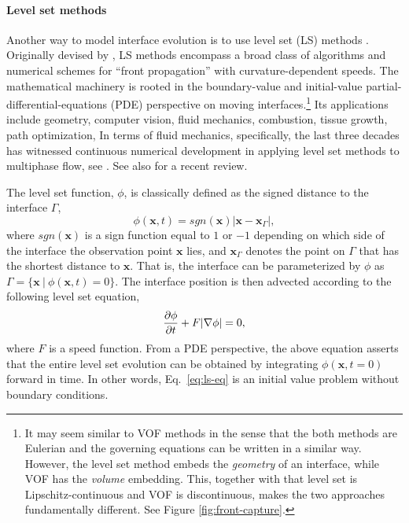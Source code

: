 \medskip
\paragraph{\bf Level set methods}

Another way to model interface evolution is to use level set (LS) methods \citep{sethian_1999a}.
Originally devised by \cite{Osher_Sethian_levelset}, LS methods encompass a broad class of algorithms and numerical schemes for ``front propagation'' with curvature-dependent speeds.
The mathematical machinery is rooted in the boundary-value and initial-value partial-differential-equations (PDE) perspective on moving interfaces.\footnote{It may seem similar to VOF methods in the sense that the both methods are Eulerian and the governing equations can be written in a similar way. However, the level set method embeds the \emph{geometry} of an interface, while VOF has the \emph{volume} embedding. This, together with that level set is Lipschitz-continuous and VOF is discontinuous, makes the two approaches fundamentally different. See Figure \ref{fig:front-capture}.}
Its applications include geometry, computer vision, fluid mechanics, combustion, tissue growth, path optimization, \etc
In terms of fluid mechanics, specifically, the last three decades has witnessed continuous numerical development in applying level set methods to multiphase flow, see \eg \cite{Mulder_JCP_1992, Sussman_JCP_1994, Sussman_JCP_2000, Enright_JCP_2002, Olsson_JCP_2005, Marchandise_JCP_2007, Desjardins_JCP_2008, Desjardins_JCP_2009, Aanjaneya_JCP_2013, Luo_JCP_2015, ICLS}. See also \cite{Gibou_Fedkiv_Osher} for a recent review.

The level set function, $\phi$, is classically defined as the signed distance to the interface $\Gamma$,
\begin{equation} \label{eq:ls-def}
    \phi({\bm x},t) = sgn({\bm x}) |{\bm x}-{\bm x}_\Gamma|,
\end{equation}
where $sgn({\bm x})$ is a sign function equal to $1$ or $-1$ depending on which side of the interface the observation point $\bm x$ lies, and ${\bm x}_\Gamma$ denotes the point on $\Gamma$ that has the shortest distance to $\bm x$.
That is, the interface can be parameterized by $\phi$ as $\Gamma = \{ {\bm x} ~ \rvert ~ \phi({\bm x},t) = 0 \}$.
The interface position is then advected according to the following level set equation,
\begin{equation} \label{eq:ls-eq}
  \frac{\partial \phi}{\partial t} + F \lvert\nabla \phi\rvert = 0,
\end{equation}
where $F$ is a speed function.
From a PDE perspective, the above equation asserts that the entire level set evolution can be obtained by integrating $\phi({\bm x},t=0)$ forward in time.
In other words, Eq.\ \eqref{eq:ls-eq} is an initial value problem without boundary conditions.

